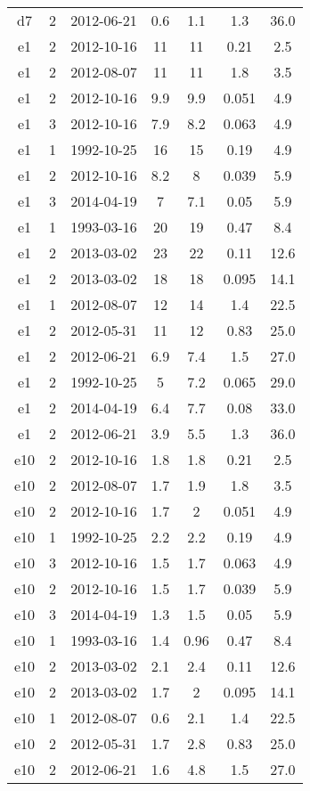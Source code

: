 \begin{table*}[htp]
\begin{tabular}{ccccccc}
d7 & 2 & 2012-06-21 & 0.6 & 1.1 & 1.3 & 36.0 \\
e1 & 2 & 2012-10-16 & 11 & 11 & 0.21 & 2.5 \\
e1 & 2 & 2012-08-07 & 11 & 11 & 1.8 & 3.5 \\
e1 & 2 & 2012-10-16 & 9.9 & 9.9 & 0.051 & 4.9 \\
e1 & 3 & 2012-10-16 & 7.9 & 8.2 & 0.063 & 4.9 \\
e1 & 1 & 1992-10-25 & 16 & 15 & 0.19 & 4.9 \\
e1 & 2 & 2012-10-16 & 8.2 & 8 & 0.039 & 5.9 \\
e1 & 3 & 2014-04-19 & 7 & 7.1 & 0.05 & 5.9 \\
e1 & 1 & 1993-03-16 & 20 & 19 & 0.47 & 8.4 \\
e1 & 2 & 2013-03-02 & 23 & 22 & 0.11 & 12.6 \\
e1 & 2 & 2013-03-02 & 18 & 18 & 0.095 & 14.1 \\
e1 & 1 & 2012-08-07 & 12 & 14 & 1.4 & 22.5 \\
e1 & 2 & 2012-05-31 & 11 & 12 & 0.83 & 25.0 \\
e1 & 2 & 2012-06-21 & 6.9 & 7.4 & 1.5 & 27.0 \\
e1 & 2 & 1992-10-25 & 5 & 7.2 & 0.065 & 29.0 \\
e1 & 2 & 2014-04-19 & 6.4 & 7.7 & 0.08 & 33.0 \\
e1 & 2 & 2012-06-21 & 3.9 & 5.5 & 1.3 & 36.0 \\
e10 & 2 & 2012-10-16 & 1.8 & 1.8 & 0.21 & 2.5 \\
e10 & 2 & 2012-08-07 & 1.7 & 1.9 & 1.8 & 3.5 \\
e10 & 2 & 2012-10-16 & 1.7 & 2 & 0.051 & 4.9 \\
e10 & 1 & 1992-10-25 & 2.2 & 2.2 & 0.19 & 4.9 \\
e10 & 3 & 2012-10-16 & 1.5 & 1.7 & 0.063 & 4.9 \\
e10 & 2 & 2012-10-16 & 1.5 & 1.7 & 0.039 & 5.9 \\
e10 & 3 & 2014-04-19 & 1.3 & 1.5 & 0.05 & 5.9 \\
e10 & 1 & 1993-03-16 & 1.4 & 0.96 & 0.47 & 8.4 \\
e10 & 2 & 2013-03-02 & 2.1 & 2.4 & 0.11 & 12.6 \\
e10 & 2 & 2013-03-02 & 1.7 & 2 & 0.095 & 14.1 \\
e10 & 1 & 2012-08-07 & 0.6 & 2.1 & 1.4 & 22.5 \\
e10 & 2 & 2012-05-31 & 1.7 & 2.8 & 0.83 & 25.0 \\
e10 & 2 & 2012-06-21 & 1.6 & 4.8 & 1.5 & 27.0 \\

\end{tabular}
\end{table*}
